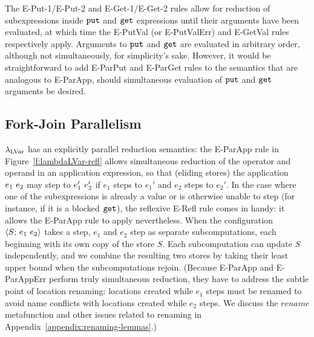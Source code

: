 The {\sc E-Put-1/E-Put-2} and {\sc E-Get-1/E-Get-2} rules allow for
reduction of subexpressions inside $\mbox{\texttt{put}}$ and $\mbox{\texttt{get}}$ expressions until
their arguments have been evaluated, at which time the {\sc E-PutVal}
(or {\sc E-PutValErr}) and {\sc E-GetVal} rules respectively apply.
Arguments to $\mbox{\texttt{put}}$ and $\mbox{\texttt{get}}$ are evaluated in arbitrary order,
although not simultaneously, for simplicity's sake.
However, it would be straightforward to
add {\sc E-ParPut} and {\sc E-ParGet} rules to the semantics that are analogous
to {\sc E-ParApp}, should simultaneous evaluation of $\mbox{\texttt{put}}$ and $\mbox{\texttt{get}}$
arguments be desired.

\FigLambdaLVishGrammar


\subsection{Fork-Join Parallelism}\label{subsection:fork-join}


$\lambda_{\textrm{LVar}}$ has an explicitly parallel reduction semantics: the {\sc
  E-ParApp} rule in Figure~\ref{f:lambdaLVar-refl} allows simultaneous
reduction of the operator and operand in an application expression, so
that (eliding stores) the application $e_1~e_2$ may step to
$e_1'~e_2'$ if $e_1$ steps to $e_1'$ and $e_2$ steps to $e_2'$.
In the case where one of the subexpressions is already a value
or is otherwise unable to step (for instance, if it is
a blocked $\mbox{\texttt{get}}$), the reflexive {\sc E-Refl}
rule comes in handy: it allows the {\sc E-ParApp} rule to apply
nevertheless.
When the configuration $\langle S;\, e_1~e_2 \rangle$ takes a step,
$e_1$ and $e_2$ step as separate subcomputations, each beginning with
its own copy of the store $S$.  Each subcomputation can update $S$
independently, and we combine the resulting two stores by taking their least
upper bound when the subcomputations rejoin.
(Because {\sc E-ParApp} and {\sc E-ParAppErr} perform
truly simultaneous reduction, they have to address the subtle point of
location renaming: locations
  created while $e_1$ steps must be renamed to avoid name conflicts
  with locations created while $e_2$ steps.  We discuss the
  $\mathit{rename}$ metafunction 
  and other issues related to renaming in Appendix~\ref{appendix:renaming-lemmas}.)

